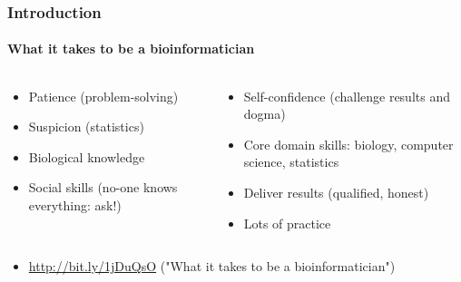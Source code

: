 \documentclass[table]{beamer}
\begin{document}
  \begin{frame}
    \frametitle{Introduction}
    \framesubtitle{What it takes to be a bioinformatician}
    \begin{columns}[t]
      \begin{column}{5cm}
        \begin{itemize}
          \item Patience (problem-solving)
          \item Suspicion (statistics)
          \item Biological knowledge
          \item Social skills (no-one knows everything: ask!)
	    \end{itemize}
	  \end{column}
	  \begin{column}{5cm}
	    \begin{itemize}
	      \item Self-confidence (challenge results and dogma)
	      \item Core domain skills: biology, computer science, statistics
	      \item Deliver results (qualified, honest)
	      \item Lots of practice
	    \end{itemize}
	  \end{column}
	\end{columns}
	\begin{itemize}
	  \item \url{http://bit.ly/1jDuQsO} ("What it takes to be a bioinformatician")
	\end{itemize}
  \end{frame}
\end{document}
